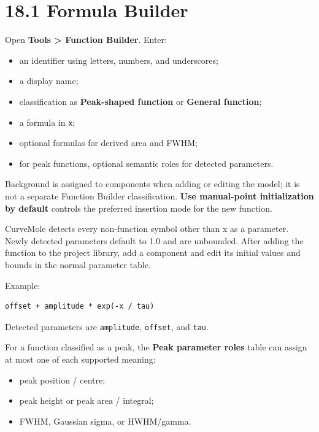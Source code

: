 \documentclass[
  10pt,
  a4paper,
  oneside]{scrreprt}
\providecommand{\tightlist}{%
  \setlength{\itemsep}{0pt}\setlength{\parskip}{0pt}}
\begin{document}
\hypertarget{formula-builder}{%
\section{18.1 Formula Builder}\label{formula-builder}}

Open \textbf{Tools \textgreater{} Function Builder}. Enter:

\begin{itemize}
\tightlist
\item
  an identifier using letters, numbers, and underscores;
\item
  a display name;
\item
  classification as \textbf{Peak-shaped function} or \textbf{General
  function};
\item
  a formula in \texttt{x};
\item
  optional formulas for derived area and FWHM;
\item
  for peak functions, optional semantic roles for detected parameters.
\end{itemize}

Background is assigned to components when adding or editing the model;
it is not a separate Function Builder classification. \textbf{Use
manual-point initialization by default} controls the preferred insertion
mode for the new function.

CurveMole detects every non-function symbol other than x as a parameter.
Newly detected parameters default to 1.0 and are unbounded. After adding
the function to the project library, add a component and edit its
initial values and bounds in the normal parameter table.

Example:

\begin{verbatim}
offset + amplitude * exp(-x / tau)
\end{verbatim}

Detected parameters are \texttt{amplitude}, \texttt{offset}, and
\texttt{tau}.

For a function classified as a peak, the \textbf{Peak parameter roles}
table can assign at most one of each supported meaning:

\begin{itemize}
\tightlist
\item
  peak position / centre;
\item
  peak height or peak area / integral;
\item
  FWHM, Gaussian sigma, or HWHM/gamma.
\end{itemize}
\end{document}

